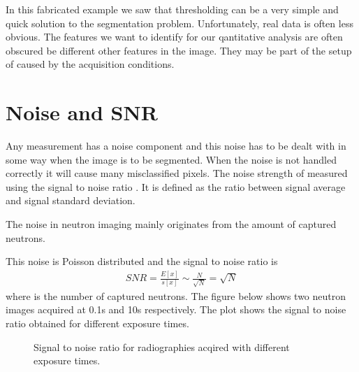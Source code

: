 \documentclass[letterpaper,10pt,english]{sphinxmanual}
\begin{document}
\begin{sphinxVerbatim}[commandchars=\\\{\}]
\PYG{p}{[}\PYG{p}{]} \PYG{p}{[}\PYG{p}{]} \PYG{p}{[}\PYG{p}{]}
\end{sphinxVerbatim}

\noindent{}

In this fabricated example we saw that thresholding can be a very simple and quick solution to the segmentation problem. Unfortunately, real data is often less obvious. The features we want to identify for our qantitative analysis are often obscured be different other features in the image. They may be part of the setup of caused by the acquisition conditions.


\section{Noise and SNR}
\label{\detokenize{ML4NeutronImageSegmentation:noise-and-snr}}
Any measurement has a noise component and this noise has to be dealt with in some way when the image is to be segmented. When the noise is not handled correctly it will cause many misclassified pixels. The noise strength of measured using the signal to noise ratio . It is defined as the ratio between signal average and signal standard deviation.

The noise in neutron imaging mainly originates from the amount of captured neutrons.



This noise is Poisson distributed and the signal to noise ratio is
\begin{equation*}
\begin{split}SNR=\frac{E[x]}{s[x]}\sim\frac{N}{\sqrt{N}}=\sqrt{N}\end{split}
\end{equation*}
where  is the number of captured neutrons. The figure below shows two neutron images acquired at 0.1s and 10s respectively. The plot shows the signal to noise ratio obtained for different exposure times.

\begin{figure}[htbp]
\centering
\capstart

\noindent{}
\caption{Signal to noise ratio for radiographies acqired with different exposure times.}\label{\detokenize{ML4NeutronImageSegmentation:id9}}\end{figure}
\end{document}
